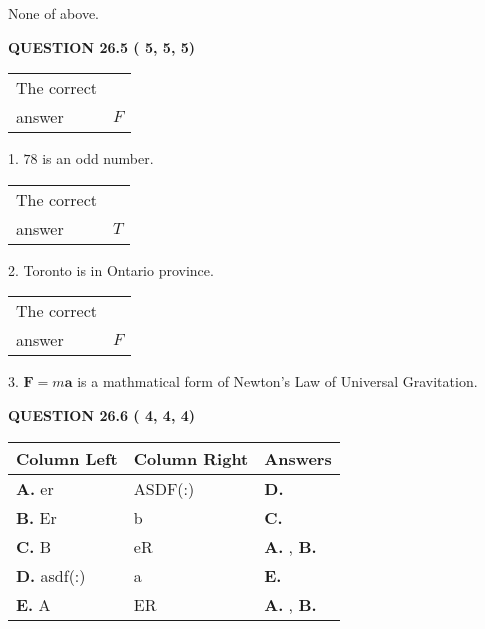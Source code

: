 \documentclass[12pt]{article}
\begin{document}
 
 None of above.
 
 
 
 
  
\vspace{0.2in}
  
{\textbf{\Large{QUESTION
26.5 
 (          5,          5,          5)
}}}
  
  
 
 
\noindent{}

 
\noindent\begin{tabular}{|l|l|}\hline The correct & \\
          answer &  %
$F$ \\ \hline \end{tabular}
1. $ %
78$ is an  %
odd number.
 
\noindent\begin{tabular}{|l|l|}\hline The correct & \\
          answer &  %
$T$ \\ \hline \end{tabular}
2.  %
Toronto is in  %
Ontario province.
 
\noindent\begin{tabular}{|l|l|}\hline The correct & \\
          answer &  %
$F$ \\ \hline \end{tabular}
3.  %
$\mathbf{F}=m\mathbf{a}$ is a mathmatical form of  %
Newton's Law of Universal Gravitation.
 
 
 
  
\vspace{0.2in}
  
{\textbf{\Large{QUESTION
26.6 
 (          4,          4,          4)
}}}
  
  
 
 
\noindent{}
  
  
\begin{tabular}{|l|l|l|}
 \hline
 Column Left & Column Right  & Answers       \\ 
 \hline
{\textbf{\large{
A.}}}
er
  & 
ASDF(:)
 & 
{\textbf{\large{
D.}}}
 \\ 
 \hline
{\textbf{\large{
B.}}}
Er
  & 
b
 & 
{\textbf{\large{
C.}}}
 \\ 
 \hline
{\textbf{\large{
C.}}}
B
  & 
eR
 & 
{\textbf{\large{
A.}}}
, 
{\textbf{\large{
B.}}}
 \\ 
 \hline
{\textbf{\large{
D.}}}
asdf(:)
  & 
a
 & 
{\textbf{\large{
E.}}}
 \\ 
 \hline
{\textbf{\large{
E.}}}
A
  & 
ER
 & 
{\textbf{\large{
A.}}}
, 
{\textbf{\large{
B.}}}
 \\ 
 \hline
 \end{tabular}
  
\end{document}
